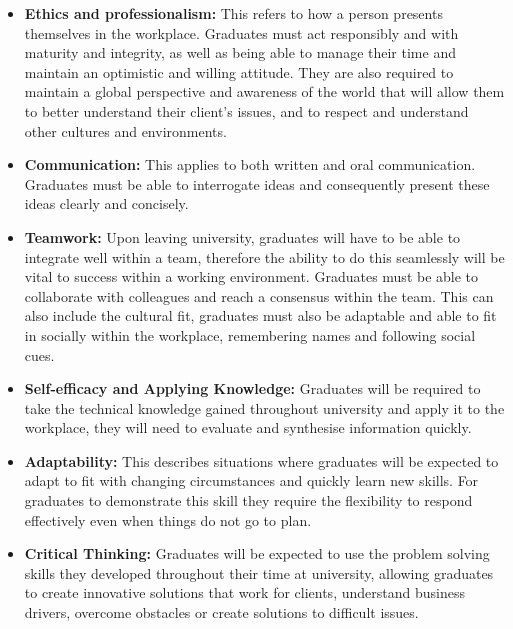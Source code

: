\documentclass{l4proj}
\begin{document}
\begin{itemize}
    \item \textbf{Ethics and professionalism:} This refers to how a person presents themselves in the workplace. Graduates must act 
    responsibly and with maturity and integrity, as well as being able to manage their time and maintain an optimistic and willing 
    attitude. They are also required to maintain a global perspective and awareness of the world that will allow them to better 
    understand their client's issues, and to respect and understand other cultures and environments.
    \item \textbf{Communication:} This applies to both written and oral communication. Graduates must be able to 
    interrogate ideas and consequently present these ideas clearly and concisely.
    \item \textbf{Teamwork:} Upon leaving university, graduates will have to be able to integrate well within a team, therefore the ability to do 
    this seamlessly will be vital to success within a working environment. Graduates must be able to collaborate with colleagues and reach
    a consensus within the team. This can also include the cultural fit, graduates must also be adaptable and able to fit in socially
    within the workplace, remembering names and following social cues.
    \item \textbf{Self-efficacy and Applying Knowledge:} Graduates will be required to take the technical knowledge gained 
    throughout university and apply it to the workplace, they will need to evaluate and synthesise information quickly.
    \item \textbf{Adaptability:} This describes situations where graduates will be expected to adapt to fit with changing circumstances and 
    quickly learn new skills. For graduates to demonstrate this skill they require the flexibility to respond effectively even when 
    things do not go to plan. 
    \item \textbf{Critical Thinking:} Graduates will be expected to use the problem solving skills they developed throughout their time at 
    university, allowing graduates to create innovative solutions that work for clients, understand business drivers,
    overcome obstacles or create solutions to difficult issues.
\end{itemize}
\end{document}
